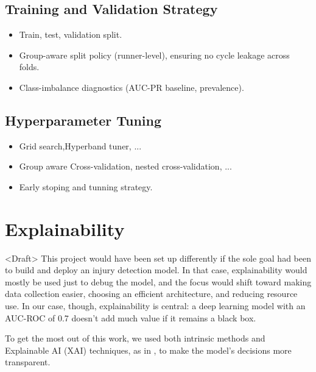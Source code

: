 
\subsection{Training and Validation Strategy}\label{subsec:method-training-validation-strategy}

\begin{itemize}
    \item Train, test, validation split.
    \item Group-aware split policy (runner-level), ensuring no cycle leakage across folds.
    \item Class-imbalance diagnostics (AUC-PR baseline, prevalence).
\end{itemize}

\subsection{Hyperparameter Tuning}\label{subsec:method-hyperparameter-tuning}

\begin{itemize}
    \item Grid search,Hyperband tuner, ...
    \item Group aware Cross-validation, nested cross-validation, ...
    \item Early stoping and tunning strategy.
\end{itemize}


\section{Explainability}\label{sec:method-explainability}
<Draft> This project would have been set up differently if the sole goal had been to build and deploy an injury detection model. In that case, explainability would mostly be used just to debug the model, and the focus would shift toward making data collection easier, choosing an efficient architecture, and reducing resource use. In our case, though, explainability is central: a deep learning model with an AUC-ROC of 0.7 doesn't add much value if it remains a black box.

To get the most out of this work, we used both intrinsic methods and Explainable AI (XAI) techniques, as in \cite{FuentesJimnez2025}, to make the model's decisions more transparent.

